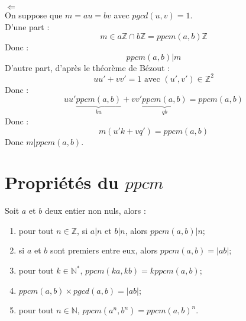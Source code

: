 \documentclass[../main.tex]{subfiles}
\begin{document}
$\boxed{\Leftarrow}$ \\
On suppose que $m = au = bv$ avec $pgcd(u, v) = 1$. \\
D'une part : 
$$m \in a \mathbb{Z} \cap b \mathbb{Z} = ppcm(a, b) \mathbb{Z}$$
Donc : 
$$ppcm(a, b) | m$$
D'autre part, d'après le théorème de Bézout :
$$uu' + vv' = 1 \text{ avec $(u', v') \in \mathbb{Z}^2$}$$
Donc : 
$$uu'\underbrace{ppcm(a, b)}_{ka} + vv'\underbrace{ppcm(a, b)}_{qb} = ppcm(a, b)$$
Donc : 
$$m(u'k + vq') = ppcm(a, b)$$
Donc $m | ppcm(a, b)$. \\

\section{Propriétés du $ppcm$}
\begin{tcolorbox}[title=Propostion 12.46, title filled=false, colframe=lightblue, colback=lightblue!10!white]
    Soit $a$ et $b$ deux entier non nuls, alors : 
    \begin{enumerate}
        \item pour tout $n \in \mathbb{Z}$, si $a|n$ et $b|n$, alors $ppcm(a,b)|n$;
        \item si $a$ et $b$ sont premiers entre eux, alors $ppcm(a,b) = |ab|$;
        \item pour tout $k \in \mathbb{N}^*$, $ppcm(ka, kb) = kppcm(a,b)$;
        \item $ppcm(a,b) \times pgcd(a,b) = |ab|$;
        \item pour tout $n \in \mathbb{N}$, $ppcm(a^n, b^n) = ppcm(a,b)^n$.
    \end{enumerate}
\end{tcolorbox}
\end{document}
